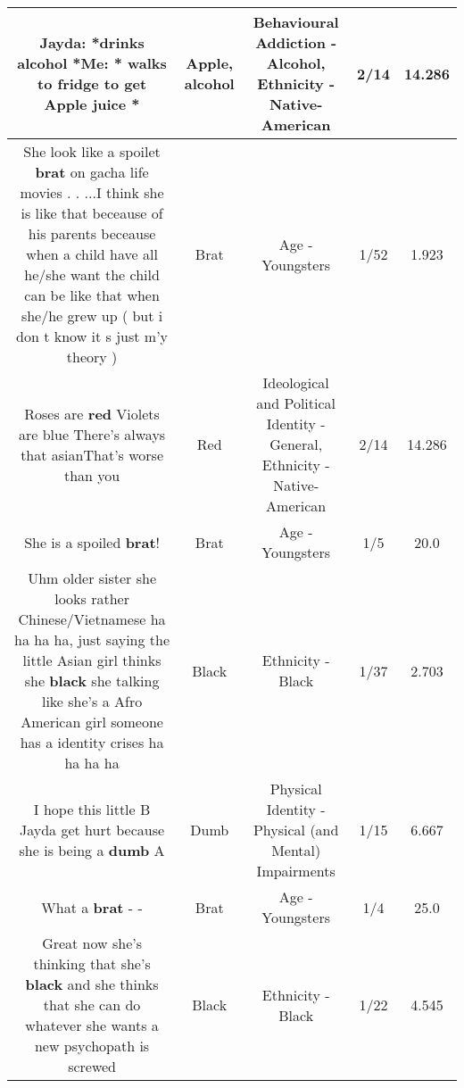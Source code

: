 \documentclass[11pt]{article}
\newlength\mylength
\begin{document}
\begin{center}
\begin{longtable}{|C{.65\mylength}|C{.30\mylength}|C{.12\mylength}|C{.12\mylength}|C{.12\mylength}|}
  \small Jayda: *drinks \textbf{alcohol} *Me: * walks to fridge to get \textbf{Apple} juice *\normalsize   & Apple, alcohol & Behavioural Addiction - Alcohol, Ethnicity - Native-American & 2/14 & 14.286 \\  \hline
  \small She look like a spoilet \textbf{brat} on gacha life movies . . ...I think she is like that beceause of his parents beceause when a child have all he/she want the child can be like that when she/he grew up ( but i don t know it s just m'y theory )\normalsize   & Brat & Age - Youngsters & 1/52 & 1.923 \\  \hline
  \small Roses are \textbf{r\textbf{ed}} Violets are blue There's always that asianThat's worse than you\normalsize   & Red &  Ideological and Political Identity - General, Ethnicity - Native-American & 2/14 & 14.286 \\  \hline
  \small She is a spoiled \textbf{brat}!\normalsize   & Brat & Age - Youngsters & 1/5 & 20.0 \\  \hline
  \small Uhm older sister she looks rather Chinese/Vietnamese ha ha ha ha, just saying the little Asian girl thinks she \textbf{black} she talking like she's a Afro American girl someone has a identity crises ha ha ha ha\normalsize   & Black & Ethnicity - Black & 1/37 & 2.703 \\  \hline
  \small I hope this little B Jayda get hurt because she is being a \textbf{dumb} A\normalsize   & Dumb & Physical Identity - Physical (and Mental) Impairments & 1/15 & 6.667 \\  \hline
  \small What a \textbf{brat} - -\normalsize   & Brat & Age - Youngsters & 1/4 & 25.0 \\  \hline
  \small Great now she's thinking that she's \textbf{black} and she thinks that she can do whatever she wants a new psychopath is screwed\normalsize   & Black & Ethnicity - Black & 1/22 & 4.545 \\  \hline

\end{longtable}
\end{center}
\end{document}
